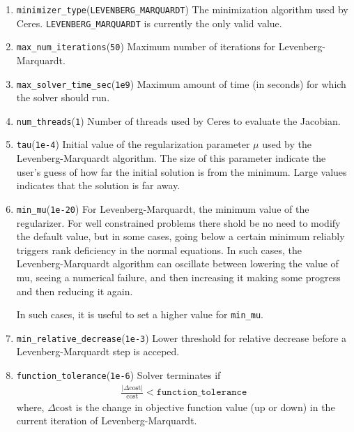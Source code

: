 \begin{enumerate}
\item{\texttt{minimizer\_type}}(\texttt{LEVENBERG\_MARQUARDT}) The  minimization algorithm used by Ceres. \texttt{LEVENBERG\_MARQUARDT} is currently the only valid value.

\item{\texttt{max\_num\_iterations}}(\texttt{50}) Maximum number of iterations for Levenberg-Marquardt.

\item{\texttt{max\_solver\_time\_sec}}(\texttt{1e9}) Maximum amount of time (in seconds) for which the solver should run.

\item{\texttt{num\_threads}}(\texttt{1})
Number of threads used by Ceres to evaluate the Jacobian.

\item{\texttt{tau}}(\texttt{1e-4}) Initial value of the regularization parameter $\mu$ used by the Levenberg-Marquardt algorithm. The size of this parameter indicate the user's guess of how far the initial solution is from the minimum. Large values indicates that the solution is far away.

\item{\texttt{min\_mu}(\texttt{1e-20})} For Levenberg-Marquardt, the minimum value of the
     regularizer. For well constrained problems there shold be no
     need to modify the default value, but in some cases, going
     below a certain minimum reliably triggers rank deficiency in
     the normal equations. In such cases, the Levenberg-Marquardt algorithm can
     oscillate between lowering the value of mu, seeing a numerical
     failure, and then increasing it making some progress and then
     reducing it again.
    
     In such cases, it is useful to set a higher value for \texttt{min\_mu}.
\item{\texttt{min\_relative\_decrease}}(\texttt{1e-3}) Lower threshold for relative decrease before a Levenberg-Marquardt step is acceped.


\item{\texttt{function\_tolerance}}(\texttt{1e-6}) Solver terminates if
\begin{align}
\frac{|\Delta \text{cost}|}{\text{cost}} < \texttt{function\_tolerance}
\end{align}
where, $\Delta \text{cost}$ is the change in objective function value (up or down) in the current iteration of Levenberg-Marquardt.


\end{enumerate}
